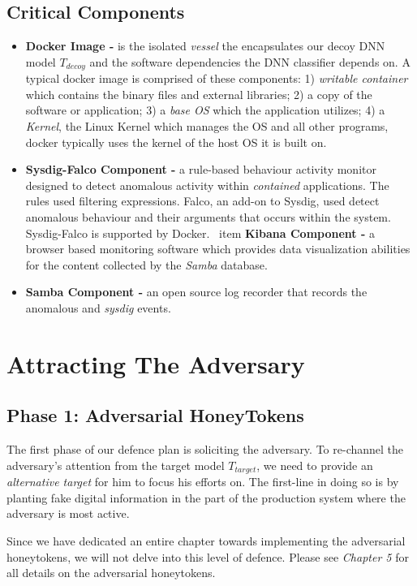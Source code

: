 \documentclass[grad,lot,lof,11pt,oneside,onehalfspace]{RUthesis}
\begin{document}
\subsection{Critical Components}
\begin{itemize}
	\item \textbf{Docker Image -}
	is the isolated \textit{vessel} the encapsulates our decoy DNN model \textit{$T_{decoy}$} and the software dependencies the DNN classifier depends on. A typical docker image is comprised of these components: 1)  \textit{writable container} which contains the binary files and external libraries; 2) a copy of the software or application; 3) a \textit{base OS} which the application utilizes; 4) a \textit{Kernel}, the Linux Kernel which manages the OS and all other programs, docker typically uses the kernel of the host OS it is built on. 
	\item \textbf{Sysdig-Falco Component -} a rule-based behaviour activity monitor designed to detect anomalous activity within \textit{contained} applications. The rules used filtering expressions. Falco, an add-on to Sysdig, used detect anomalous behaviour and their arguments that occurs within the system. Sysdig-Falco is supported by Docker.
	\    item \textbf{Kibana Component -} a browser based monitoring software which provides data visualization abilities for the content collected by the \textit{Samba} database.
	\item \textbf{Samba Component -}
	an open source log recorder that records the anomalous and \textit{sysdig} events.	
\end{itemize}
\section{Attracting The Adversary}
\subsection{Phase 1: Adversarial HoneyTokens}
The first phase of our defence plan is soliciting the adversary. To re-channel the adversary's attention from the target model \textit{$T_{target}$}, we need to provide an \textit{alternative target} for him to focus his efforts on. The first-line in doing so is by planting fake digital information in the part of the production system where the adversary is most active.


Since we have dedicated an entire chapter towards implementing the adversarial honeytokens, we will not delve into this level of defence. Please see \textit{Chapter 5} for all details on the adversarial honeytokens. 
\end{document}
